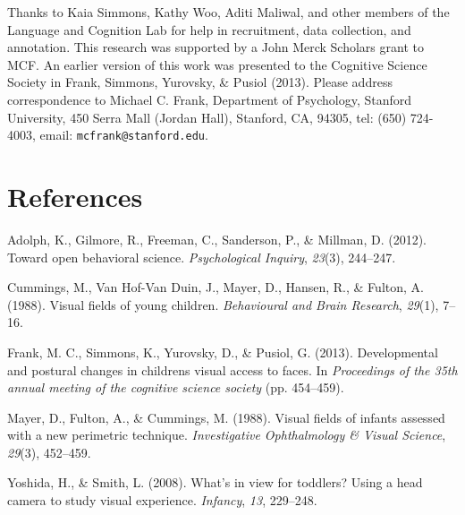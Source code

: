 \documentclass[10pt, letterpaper]{article}
\begin{document}
Thanks to Kaia Simmons, Kathy Woo, Aditi Maliwal, and other members of
the Language and Cognition Lab for help in recruitment, data collection,
and annotation. This research was supported by a John Merck Scholars
grant to MCF. An earlier version of this work was presented to the
Cognitive Science Society in Frank, Simmons, Yurovsky, \& Pusiol (2013).
Please address correspondence to Michael C. Frank, Department of
Psychology, Stanford University, 450 Serra Mall (Jordan Hall), Stanford,
CA, 94305, tel: (650) 724-4003, email: \texttt{mcfrank@stanford.edu}.

\section{References}\label{references}

\setlength{\parindent}{-0.1in} \setlength{\leftskip}{0.125in} \noindent

\hypertarget{refs}{}
\hypertarget{ref-adolph2012}{}
Adolph, K., Gilmore, R., Freeman, C., Sanderson, P., \& Millman, D.
(2012). Toward open behavioral science. \emph{Psychological Inquiry},
\emph{23}(3), 244--247.

\hypertarget{ref-cummings1988}{}
Cummings, M., Van Hof-Van Duin, J., Mayer, D., Hansen, R., \& Fulton, A.
(1988). Visual fields of young children. \emph{Behavioural and Brain
Research}, \emph{29}(1), 7--16.

\hypertarget{ref-frank2013}{}
Frank, M. C., Simmons, K., Yurovsky, D., \& Pusiol, G. (2013).
Developmental and postural changes in childrens visual access to faces.
In \emph{Proceedings of the 35th annual meeting of the cognitive science
society} (pp. 454--459).

\hypertarget{ref-mayer1988}{}
Mayer, D., Fulton, A., \& Cummings, M. (1988). Visual fields of infants
assessed with a new perimetric technique. \emph{Investigative
Ophthalmology \& Visual Science}, \emph{29}(3), 452--459.

\hypertarget{ref-yoshida2008}{}
Yoshida, H., \& Smith, L. (2008). What's in view for toddlers? Using a
head camera to study visual experience. \emph{Infancy}, \emph{13},
229--248.
\end{document}
